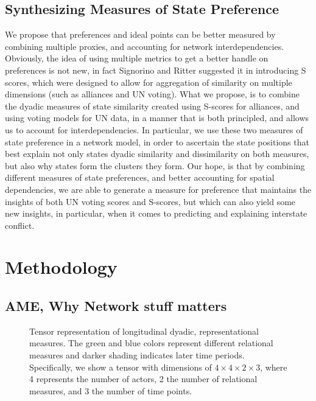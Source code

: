 \subsection{Synthesizing Measures of State Preference}

We propose that preferences and ideal points can be better measured by combining multiple proxies, and accounting for network interdependencies. Obviously, the idea of using multiple metrics to get a better handle on preferences is not new, in fact Signorino and Ritter suggested it in introducing S scores, which were designed to allow for aggregation of similarity on multiple dimensions (such as alliances and UN voting). What we propose, is to combine the dyadic measures of state similarity created using S-scores for alliances, and using voting models for UN data, in a manner that is both principled, and allows us to account for interdependencies. In particular, we use these two measures of state preference in a network model, in order to ascertain the state positions that best explain not only states dyadic similarity and dissimilarity on both measures, but also why states form the clusters they form. Our hope, is that by combining different measures of state preferences, and better accounting for spatial dependencies, we are able to generate a measure for preference that maintains the insights of both UN voting scores and S-scores, but which can also yield some new insights, in particular, when it comes to predicting and explaining interstate conflict.

\section{Methodology}

\subsection{AME, Why Network stuff matters}

\begin{figure}[ht]
	\centering
	\resizebox{.5\textwidth}{!}{}
	\caption{Tensor representation of longitudinal dyadic, representational measures. The green and blue colors represent different relational measures and darker shading indicates later time periods. Specifically, we show a tensor with dimensions of $4 \times 4 \times 2 \times 3$, where 4 represents the number of actors, 2 the number of relational measures, and 3 the number of time points.}
	\label{fig:tensViz}
\end{figure}

